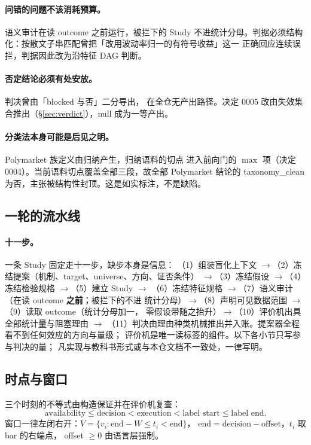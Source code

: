 \documentclass[11pt]{ctexart}
\begin{document}
\paragraph{问错的问题不该消耗预算。}语义审计在读 outcome 之前运行，被拦下的 Study
不进统计分母。判据必须结构化：按散文子串匹配曾把「改用波动率归一的有符号收益」这一
正确回应连续误拦，判据因此改为沿特征 DAG 判断。

\paragraph{否定结论必须有处安放。}判决曾由「blocked 与否」二分导出，
在全仓无产出路径。决定 0005 改由失效集合推出（\S\ref{sec:verdict}），null 成为一等产出。

\paragraph{分类法本身可能是后见之明。}Polymarket 族定义由归纳产生，归纳语料的切点
进入前向门的 $\max$ 项（决定 0004）。当前语料切点覆盖全部三段，故全部 Polymarket
结论的 taxonomy\_clean 为否，主张被结构性封顶。这是如实标注，不是缺陷。

\subsection{一轮的流水线}
\paragraph{十一步。}一条 Study 固定走十一步，缺步本身是信息：
（1）组装盲化上下文 $\to$（2）冻结提案（机制、target、universe、方向、证否条件）
$\to$（3）冻结假设 $\to$（4）冻结检验规格 $\to$（5）建立 Study $\to$
（6）冻结特征规格 $\to$（7）语义审计（在读 outcome \textbf{之前}；被拦下的不进
统计分母）$\to$（8）声明可见数据范围 $\to$（9）读取 outcome（统计分母加一，
零假设带随之抬升）$\to$（10）评价机出具全部统计量与阻塞理由 $\to$
（11）判决由理由种类机械推出并入账。提案器全程看不到任何效应的方向与量级；
评价机是唯一读标签的组件。以下各小节只写参与判决的量；
凡实现与教科书形式或与本仓文档不一致处，一律写明。

\subsection{时点与窗口}
三个时刻的不等式由构造保证并在评价机复查：
\[ \text{availability} \le \text{decision} < \text{execution} < \text{label start}
   \le \text{label end}. \]
窗口一律左闭右开：$V=\{v_i: \text{end}-W \le t_i < \text{end}\}$，
$\text{end}=\text{decision}-\text{offset}$，$t_i$ 取 bar 的右端点，
offset $\ge 0$ 由语言层强制。
\end{document}
